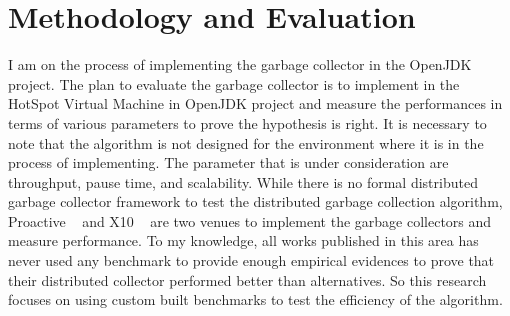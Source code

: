 \section{Methodology and Evaluation}
I am on the process of implementing the garbage collector in the OpenJDK project. The plan to evaluate the garbage collector  is to implement in the HotSpot Virtual Machine in OpenJDK project and measure the performances in terms of various parameters to prove the hypothesis is right. It is necessary to note that the algorithm is not designed for the environment where it is in the process of implementing. The parameter that is under consideration are throughput, pause time,  and scalability. While there is no formal distributed garbage collector framework to test the distributed garbage collection algorithm, Proactive ~\cite{activeon} and X10 ~\cite{x10} are two venues to implement the garbage collectors and measure performance. To my knowledge, all works published in this area has never used any benchmark to provide enough empirical evidences to prove that their distributed collector performed better than alternatives. So this research focuses on using custom built benchmarks to test the efficiency of the algorithm.

